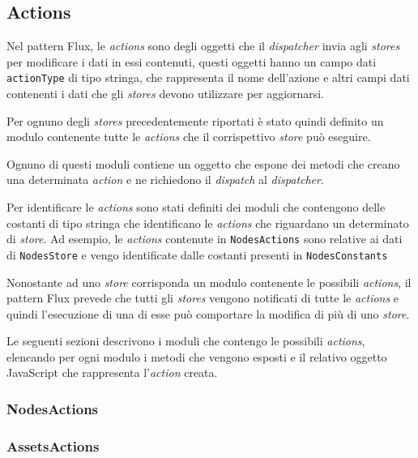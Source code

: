 \subsection{Actions}

Nel pattern Flux, le \textit{actions} sono degli oggetti che il \textit{dispatcher} invia agli \textit{stores} per modificare i dati in essi contenuti, questi oggetti hanno un campo dati \texttt{actionType} di tipo stringa, che rappresenta il nome dell'azione e altri campi dati contenenti i dati che gli \textit{stores} devono utilizzare per aggiornarsi.

Per ognuno degli \textit{stores} precedentemente riportati è stato quindi definito un modulo contenente tutte le \textit{actions} che il corrispettivo \textit{store} può eseguire.

Ognuno di questi moduli contiene un oggetto che espone dei metodi che creano una determinata \textit{action} e ne richiedono il \textit{dispatch} al \textit{dispatcher}.

Per identificare le \textit{actions} sono stati definiti dei moduli che contengono delle costanti di tipo stringa che identificano le \textit{actions} che riguardano un determinato di \textit{store}. Ad esempio, le \textit{actions} contenute in \texttt{NodesActions} sono relative ai dati di \texttt{NodesStore} e vengo identificate dalle costanti presenti in \texttt{NodesConstants}

Nonostante ad uno \textit{store} corrisponda un modulo contenente le possibili \textit{actions}, il pattern Flux prevede che tutti gli \textit{stores} vengono notificati di tutte le \textit{actions} e quindi l'esecuzione di una di esse può comportare la modifica di più di uno \textit{store}.

Le seguenti sezioni descrivono i moduli che contengo le possibili \textit{actions}, elencando per ogni modulo i metodi che vengono esposti e il relativo oggetto JavaScript che rappresenta l'\textit{action} creata.


\subsubsection{NodesActions}


\subsubsection{AssetsActions}


